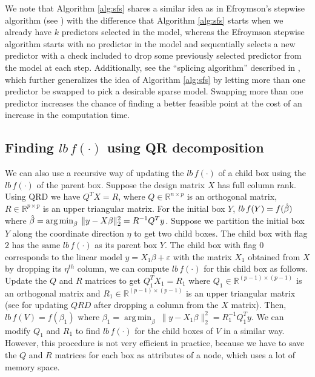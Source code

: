 \documentclass[10pt, letterpaper]{article}
\DeclareMathOperator*{\argmin}{arg\,min}
\begin{document}
We note that Algorithm \ref{alg:sfs} shares a similar idea as in Efroymson's stepwise algorithm (see \cite{miller2002subset}) with the difference that Algorithm \ref{alg:sfs} starts when we already have $k$ predictors selected in the model, whereas the Efroymson stepwise algorithm starts with no predictor in the model and sequentially selects a new predictor with a check included to drop some previously selected predictor from the model at each step. Additionally, see the ``splicing algorithm'' described in \cite{zhu2020polynomial}, which further generalizes the idea of Algorithm \ref{alg:sfs} by letting more than one predictor be swapped to pick a desirable sparse model. Swapping more than one predictor increases the chance of finding a better feasible point at the cost of an increase in the computation time.
\subsection{Finding $lb \, f(\cdot)$ using QR decomposition}
We can also use a recursive way of updating the $lb \, f(\cdot)$ of a child box using the $lb \, f(\cdot)$ of the parent box.
Suppose the design matrix $X$ has full column rank. Using QRD we have $Q^{T}X=R$, where $Q \in \mathbb{R}^{ n\times p}$ is an orthogonal matrix, $R \in \mathbb{R}^{p\times p}$ is an upper triangular matrix. For the initial box $Y$, 
$lb \, f(Y)=f(\Hat{\beta})$ where \( \Hat{\beta}= \argmin_{\beta} \> \|y-X\beta\|_{2}^{2}=R^{-1} Q^{T}y \). 
Suppose we partition the initial box $Y$ along the coordinate direction $\eta$ to get two child boxes. The child box with flag $2$ has the same $lb\, f(\cdot)$ as its parent box $Y$. The child box with flag $0$ corresponds to the linear model $y=X_{1}\beta +\varepsilon$ with the matrix $X_{1}$ obtained from $X$ by dropping its $\eta^{th}$ column, we can compute $lb \, f(\cdot)$ for this child box as follows. Update the $Q$ and $R$ matrices to get $Q_{1}^{T} X_{1}=R_{1}$ where $Q_{1}\in \mathbb{R}^{(p-1) \times (p-1)}$ is an orthogonal matrix and $R_{1} \in \mathbb{R}^{(p-1)\times (p-1)}$ is an upper triangular matrix (see \cite{watkins2010fundmatrixcomp} for updating $QRD$ after dropping a column from the $X$ matrix). Then, $lb\, f(V)=f(\beta_{1})$ where \( \beta_{1}= \argmin_{\beta} \> \|y-X_{1}\beta\|_{2}^{2}=R_{1}^{-1}Q_{1}^{T}y \).
We can modify $Q_{1}$ and $R_{1}$ to find $lb\,f(\cdot)$ for the child boxes of $V$ in a similar way. However, this procedure is not very efficient in practice, because we have to save the $Q$ and $R$ matrices for each box as attributes of a node, which uses a lot of memory space.
\end{document}
